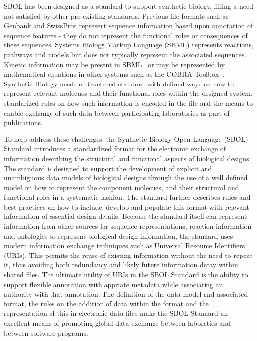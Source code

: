SBOL has been designed as a standard to support synthetic biology, filling a need not satisfied by other pre-existing standards.
Previous file formats such as Genbank and SwissProt represent sequence information based upon annotation of sequence features - they do not represent the functional roles or consequences of these sequences. Systems Biology Markup Language (SBML) represents reactions, pathways and models but does not typically represent the associated sequences.  Kinetic information may be present in SBML~\cite{SBML} or may be represented by mathematical equations in other systems such as the COBRA Toolbox~\cite{COBRA}. Synthetic Biology needs a structured standard with defined ways on how to represent relevant molecues and their functional roles within the designed system, standarized rules on how such information is encoded in the file and the means to enable exchange of such data between participating laboratories as part of publications. 



To help address these challenges, the Synthetic Biology Open Language (SBOL) Standard introduces a standardized format for the electronic exchange of information describing the structural and functional aspects of biological designs. 
The standard is designed to support the development of explicit and unambiguous data models of biological designs through the use of a well defined model on how to represent the component molecues, and their structural and functional roles in a systematic fashion. 
The standard further describes rules and best practices on how to include, develop and populate this format with relevant information of essential design details. 
Because the standard itself can represent information from other sources for sequence representations, reaction information and ontologies to represent biological design information, the standard uses modern information exchange techniques such as Universal Resource Identifiers (URIs). This permits the reuse of existing information without the need to repeat it, thus avoiding both redundancy and likely future information decay within shared files. The ultimate utility of URIs in the SBOL Standard is the ability to support flexible annotation with appriate metadata while associating an authority with that annotation. The definition of the data model and associated format, the rules on the addition of data within the format and the representation of this in electronic data files make the SBOL Standard an excellent means of promoting global data exchange between laboraties and between software programs.

